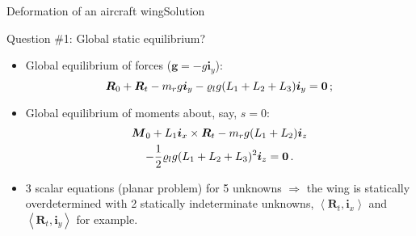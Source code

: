 \documentclass{beamer}
\newcommand{\demi}{\frac{1}{2}}
\newcommand{\imply}{\Rightarrow}
\newcommand{\xj}{x}
\newcommand{\yj}{y}
\newcommand{\zj}{z}
\renewcommand{\ij}{i}
\newcommand{\iv}{{\boldsymbol\ij}}
\newcommand{\gj}{g}
\newcommand{\gv}{{\boldsymbol\gj}}
\newcommand{\roi}{\varrho}
\newcommand{\Fresj}{R}
\newcommand{\Mresj}{M}
\newcommand{\Fres}{{\boldsymbol\Fresj}}
\newcommand{\Mres}{{\boldsymbol\Mresj}}
\newcommand{\bzero}{{\bf 0}}
\newcommand{\scal}[1]{\left\langle{#1}\right\rangle}
\begin{document}
\begin{frame}{Deformation of an aircraft wing}{Solution}
\begin{overprint}
\vskip-20pt
\begin{exampleblock}{Question \#1: Global static equilibrium?}
\begin{itemize}
\item Global equilibrium of forces ($\gv=-g\iv_\yj$):
\begin{displaymath}
\Fres_0+\Fres_t -m_r g\iv_\yj -\roi_l g(L_1+L_2+L_3)\iv_\yj =\bzero\,;
\end{displaymath}
\item Global equilibrium of moments about, say, $s=0$:
\begin{multline*}
\Mres_0 + L_1\iv_\xj\times\Fres_t -m_r g (L_1+L_2)\iv_\zj \\
-\demi\roi_l g (L_1+L_2+L_3)^2\iv_\zj=\bzero\,.
\end{multline*}
\item 3 scalar equations (planar problem) for 5 unknowns $\imply$ the wing is statically overdetermined with 2 statically indeterminate unknowns, $\scal{\Fres_t,\iv_\xj}$ and $\scal{\Fres_t,\iv_\yj}$ for example.
\end{itemize}
\end{exampleblock}

\end{overprint}

\end{frame}
\end{document}
